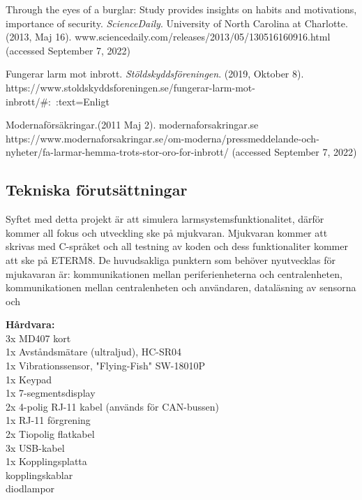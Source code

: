 \documentclass[a4paper]{article}
\begin{document}
\begin{thebibliography}{99}
 Through the eyes of a burglar: Study provides insights on habits and motivations, importance of security. \emph{ScienceDaily}. University of North Carolina at Charlotte. (2013, Maj 16). www.sciencedaily.com/releases/2013/05/130516160916.html (accessed September 7, 2022)

 Fungerar larm mot inbrott. \emph{Stöldskyddsföreningen}. (2019, Oktober 8). https://www.stoldskyddsforeningen.se/fungerar-larm-mot-inbrott/#:~:text=Enligt%

 Modernaförsäkringar.(2011 Maj 2). modernaforsakringar.se https://www.modernaforsakringar.se/om-moderna/pressmeddelande-och-nyheter/fa-larmar-hemma-trots-stor-oro-for-inbrott/ (accessed September 7, 2022)
\end{thebibliography}


\subsection{Tekniska förutsättningar}

Syftet med detta projekt är att simulera larmsystemsfunktionalitet, därför kommer all fokus och utveckling ske på mjukvaran. Mjukvaran kommer att skrivas med C-språket och all testning av koden och dess funktionaliter kommer att ske på ETERM8. De huvudsakliga punktern som behöver nyutvecklas för mjukavaran är: kommunikationen mellan periferienheterna och centralenheten, kommunikationen mellan centralenheten och användaren, dataläsning av sensorna och 


\textbf{Hårdvara:} 
\\
3x MD407 kort \\
1x Avståndsmätare (ultraljud), HC-SR04 \\
1x Vibrationssensor, "Flying-Fish" SW-18010P \\
1x Keypad \\
1x 7-segmentsdisplay \\
2x 4-polig RJ-11 kabel (används för CAN-bussen) \\
1x RJ-11 förgrening \\
2x Tiopolig flatkabel \\
3x USB-kabel \\
1x Kopplingsplatta \\
kopplingskablar\\
diodlampor\\
\\\\
\end{document}
